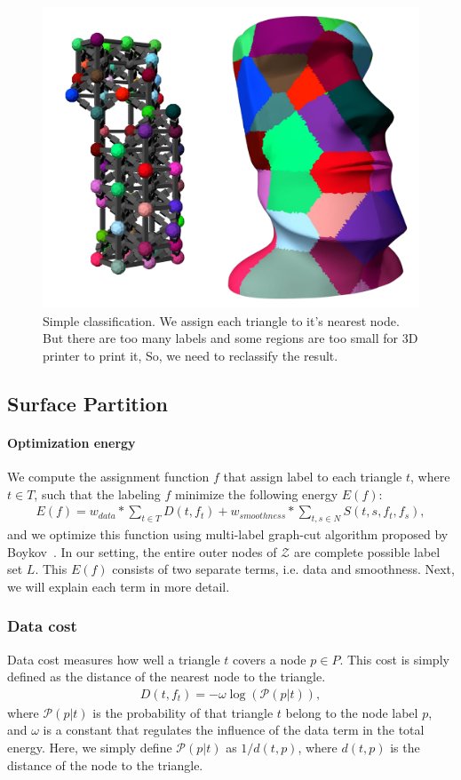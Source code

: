 \begin{figure}[ht]
\centering
\includegraphics[width=0.75\linewidth]{figs/nearest_node.pdf} 
\caption{Simple classification. We assign each triangle to it's nearest node. But there are too many labels and some regions are too small for 3D printer to print it, So, we need to reclassify the result.}
\label{fig:nearest}
\end{figure}

\subsection{Surface Partition}
\paragraph{Optimization energy}
We compute the assignment function $f$ that assign label to each triangle $t$, where $t \in T$, such that the labeling $f$ minimize the following energy $E(f)$:
\begin{align} \label{eq:graph}
E(f) = w_{data} * \sum_{t\in T}D(t, f_t) + w_{smoothness} * \sum_{t,s\in N} S(t, s, f_t, f_s),
\end{align}
and we optimize this function using multi-label graph-cut algorithm proposed by Boykov~\cite{boykov:2004:experimental}.
In our setting, the entire outer nodes of $\mathcal{Z}$ are complete possible label set $L$.
This $E(f)$ consists of two separate terms, i.e. data and smoothness.
Next, we will explain each term in more detail.

\subsubsection{Data cost}
Data cost measures how well a triangle $t$ covers a node $p \in P$.
This cost is simply defined as the distance of the nearest node to the triangle.
\begin{align}
D(t, f_t) = -\omega \log(\mathcal{P}(p | t)),
\end{align}
where $\mathcal{P}(p | t)$ is the probability of that triangle $t$ belong to the node label $p$, and $\omega$ is a constant that
regulates the influence of the data term in the total energy.
Here, we simply define $\mathcal{P}(p | t)$ as $1/d(t,p)$, where $d(t,p)$ is the distance of the node to the triangle.
